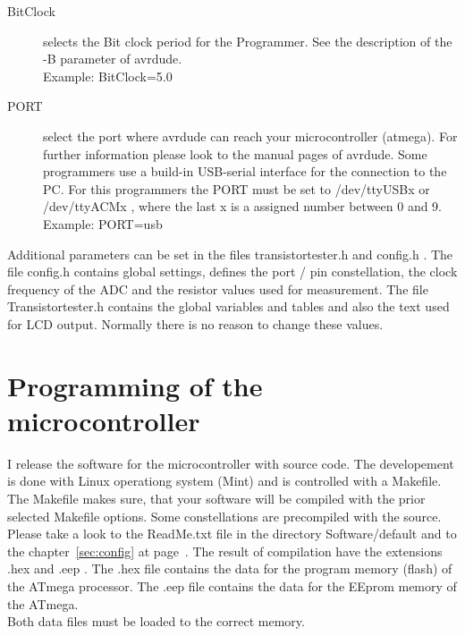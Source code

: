 \begin{description}
  \item[BitClock] selects the Bit clock period for the Programmer. See the description of the -B parameter of avrdude.\\
Example: BitClock=5.0

  \item[PORT] select the port where avrdude can reach your microcontroller (atmega).
For further information please look to the manual pages of avrdude.
Some programmers use a build-in USB-serial interface for the connection to the PC.
For this programmers the PORT must be set to /dev/ttyUSBx or /dev/ttyACMx , where
the last x is a assigned number between 0 and 9.\\
Example: PORT=usb

\end{description}

Additional parameters can be set in the files transistortester.h and config.h .
The file config.h contains global settings, defines the port / pin constellation,
 the clock frequency of the ADC and the resistor values used for measurement.
The file Transistortester.h contains the global variables and tables and also the text used for LCD output.
Normally there is no reason to change these values.



\section{Programming of the microcontroller}
I release the software for the microcontroller with source code.
The developement is done with Linux operationg system (Mint) and
is controlled with a Makefile.
The Makefile makes sure, that your software will be compiled with the prior selected Makefile options.
Some constellations are precompiled with the source.
Please take a look to the ReadMe.txt file
in the directory Software/default and to the chapter~\ref{sec:config} at page~\pageref{sec:config}.
The result of compilation have the extensions .hex and .eep .
The .hex file contains the data for the program memory (flash) of the ATmega processor.
The .eep file contains the data for the EEprom memory of the ATmega.\\
Both data files must be loaded to the correct memory.

